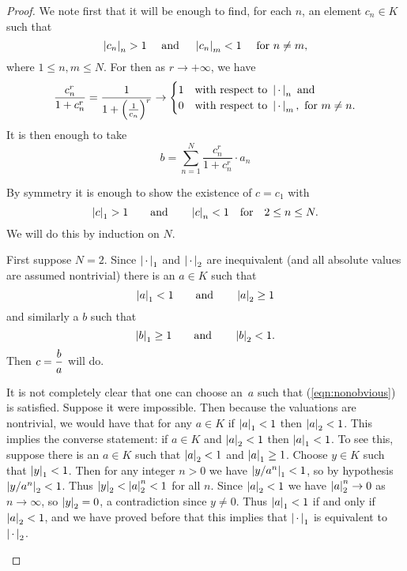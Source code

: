 \begin{proof}
  We note first that it will be enough to find, for each $n$, an
  element $c_n\in K$ such that 
$$
  \left|c_n\right|_n > 1 \quad \text{ and } \quad \left|c_n\right|_m < 1
  \quad\text{ for }n\neq m,
  $$
  where $1\leq n,m\leq N$.  For then as $r\to+\infty$, we have
$$
\frac{c_n^r}{1+c_n^r} = \frac{1}{1+\left(\frac{1}{c_n}\right)^{r}}
 \to \begin{cases} 1 & \text{with respect to } \left|\,\cdot\,\right|_n \text{ and }\\
                   0 & \text{with respect to } \left|\,\cdot\,\right|_m, \text{ for }
                   m\neq n.
     \end{cases}
     $$
  It is then enough to take
$$
   b = \sum_{n=1}^N \frac{c_n^r}{1+c_n^r} \cdot a_n
$$

By symmetry it is enough to show the existence of $c=c_1$ with
$$
  \left|c\right|_1 > 1 \qquad \text{and} \qquad \left|c\right|_n<1 \quad
\text{for} \quad 2\leq n\leq N.
$$
We will do this by induction on $N$.

First suppose $N=2$.  Since $\left|\,\cdot\,\right|_1$ and $\left|\,\cdot\,\right|_2$ are
inequivalent (and all absolute values are assumed nontrivial)
there is an $a\in K$ such that 
\begin{equation}\label{eqn:nonobvious}
  \left|a\right|_1 < 1\qquad \text{and}\qquad \left|a\right|_2 \geq 1
\end{equation}
and similarly a $b$ such that 
$$
  \left|b\right|_1 \geq 1\qquad \text{and}\qquad \left|b\right|_2 < 1.
$$
Then $\displaystyle c=\frac{b}{a}$ will do.

\begin{remark}  
  It is not completely clear that
  one can choose an~$a$ such that (\ref{eqn:nonobvious}) is satisfied.
  Suppose it were impossible.  Then because the valuations are
  nontrivial, we would have that for any $a\in K$ if $\left|a\right|_1<1$
  then $\left|a\right|_2<1$.  This implies the converse statement: if $a\in
  K$ and $\left|a\right|_2<1$ then $\left|a\right|_1<1$.  To see this, suppose there
  is an $a\in K$ such that $\left|a\right|_2<1$ and $\left|a\right|_1\geq 1$.
  Choose $y\in K$ such that $\left|y\right|_1<1$.  Then for any integer $n>0$
  we have $\left|y/a^n\right|_1<1$, so by hypothesis $\left|y/a^n\right|_2<1$.  Thus
  $\left|y\right|_2 < \left|a\right|_2^n < 1$ for all $n$.  Since $\left|a\right|_2<1$ we
  have $\left|a\right|_2^n\to 0$ as $n\to\infty$, so $\left|y\right|_2=0$, a
  contradiction since $y\neq 0$.  Thus $\left|a\right|_1<1$ if and only if
  $\left|a\right|_2<1$, and we have proved before that this implies that
  $\left|\,\cdot\,\right|_1$ is equivalent to $\left|\,\cdot\,\right|_2$.
\end{remark}



\end{proof}
